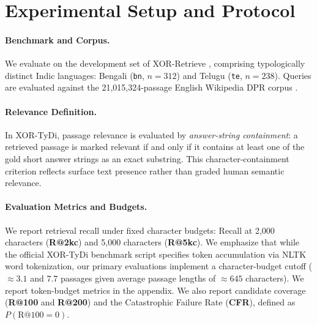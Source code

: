 \documentclass[11pt]{article}
\begin{document}
\section{Experimental Setup and Protocol}
\label{sec:setup}

\paragraph{Benchmark and Corpus.} We evaluate on the development set of XOR-Retrieve \citep{asai2021xor}, comprising typologically distinct Indic languages: Bengali (\texttt{bn}, $n=312$) and Telugu (\texttt{te}, $n=238$). Queries are evaluated against the 21,015,324-passage English Wikipedia DPR corpus \citep{karpukhin2020dense}.

\paragraph{Relevance Definition.} In XOR-TyDi, passage relevance is evaluated by \emph{answer-string containment}: a retrieved passage is marked relevant if and only if it contains at least one of the gold short answer strings as an exact substring. This character-containment criterion reflects surface text presence rather than graded human semantic relevance.

\paragraph{Evaluation Metrics and Budgets.} We report retrieval recall under fixed character budgets: Recall at 2,000 characters (\textbf{R@2kc}) and 5,000 characters (\textbf{R@5kc}). We emphasize that while the official XOR-TyDi benchmark script \citep{asai2021xor} specifies token accumulation via NLTK word tokenization, our primary evaluations implement a character-budget cutoff ($\approx 3.1$ and $7.7$ passages given average passage lengths of $\approx 645$ characters). We report token-budget metrics in the appendix. We also report candidate coverage (\textbf{R@100} and \textbf{R@200}) and the Catastrophic Failure Rate (\textbf{CFR}), defined as $P(\mathrm{R@100}=0)$.
\end{document}
